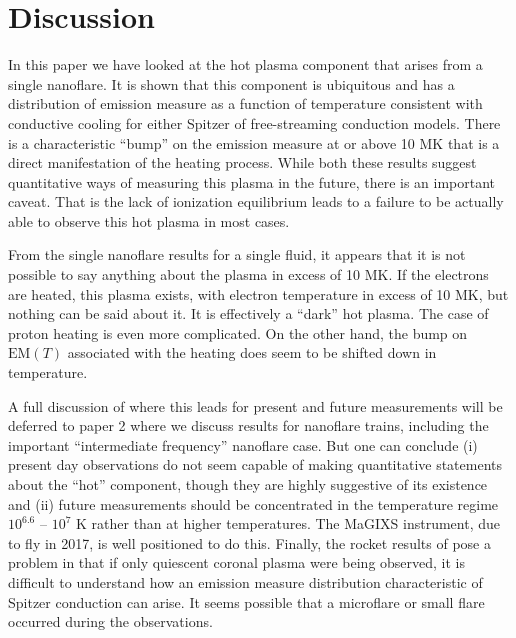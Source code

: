 \documentclass[apj]{emulateapj}
\begin{document}
	\section{Discussion}
	\label{sec:discussion}
	\par In this paper we have looked at the hot plasma component that arises from a single nanoflare. It is shown that this component is ubiquitous and has a distribution of emission measure as a function of temperature consistent with conductive cooling for either Spitzer of free-streaming conduction models. There is a characteristic ``bump'' on the emission measure at or above 10 MK that is a direct manifestation of the heating process. While both these results suggest quantitative ways of measuring this plasma in the future, there is an important caveat. That is the lack of ionization equilibrium leads to a failure to be actually able to observe this hot plasma in most cases.
	\par From the single nanoflare results for a single fluid, it appears that it is not possible to say anything about the plasma in excess of 10 MK. If the electrons are heated, this plasma exists, with electron temperature in excess of 10 MK, but nothing can be said about it. It is effectively a ``dark'' hot plasma. The case of proton heating is even more complicated. On the other hand, the bump on $\mathrm{EM}(T)$ associated with the heating does seem to be shifted down in temperature.
	\par A full discussion of where this leads for present and future measurements will be deferred to paper 2 where we discuss results for nanoflare trains, including the important ``intermediate frequency'' nanoflare case. But one can conclude (i) present day observations do not seem capable of making quantitative statements about the ``hot'' component, though they are highly suggestive of its existence and (ii) future measurements should be concentrated in the temperature regime $10^{6.6}$ – $10^7$ K rather than at higher temperatures. The MaGIXS instrument, due to fly in 2017, is well positioned to do this. Finally, the rocket results of \citet{caspi_new_2015} pose a problem in that if only quiescent coronal plasma were being observed, it is difficult to understand how an emission measure distribution characteristic of Spitzer conduction can arise. It seems possible that a microflare or small flare occurred during the observations.
	
	
	
	\clearpage
\end{document}
